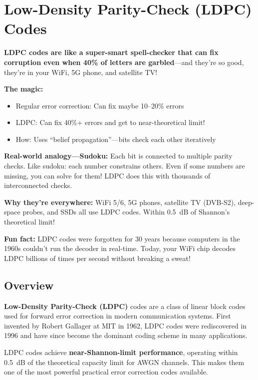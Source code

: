 \chapter{Low-Density Parity-Check (LDPC) Codes}
\label{ch:ldpc}

\begin{nontechnical}
\textbf{LDPC codes are like a super-smart spell-checker that can fix corruption even when 40\% of letters are garbled}---and they're so good, they're in your WiFi, 5G phone, and satellite TV!

\textbf{The magic:}
\begin{itemize}
\item Regular error correction: Can fix maybe 10--20\% errors
\item LDPC: Can fix 40\%+ errors and get to near-theoretical limit!
\item How: Uses ``belief propagation''---bits check each other iteratively
\end{itemize}

\textbf{Real-world analogy---Sudoku:} Each bit is connected to multiple parity checks. Like sudoku: each number constrains others. Even if some numbers are missing, you can solve for them! LDPC does this with thousands of interconnected checks.

\textbf{Why they're everywhere:} WiFi 5/6, 5G phones, satellite TV (DVB-S2), deep-space probes, and SSDs all use LDPC codes. Within 0.5~dB of Shannon's theoretical limit!

\textbf{Fun fact:} LDPC codes were forgotten for 30 years because computers in the 1960s couldn't run the decoder in real-time. Today, your WiFi chip decodes LDPC billions of times per second without breaking a sweat!
\end{nontechnical}

\section{Overview}

\textbf{Low-Density Parity-Check (LDPC)} codes are a class of linear block codes used for forward error correction in modern communication systems. First invented by Robert Gallager at MIT in 1962, LDPC codes were rediscovered in 1996 and have since become the dominant coding scheme in many applications.

\begin{keyconcept}
LDPC codes achieve \textbf{near-Shannon-limit performance}, operating within 0.5~dB of the theoretical capacity limit for AWGN channels. This makes them one of the most powerful practical error correction codes available.
\end{keyconcept}

